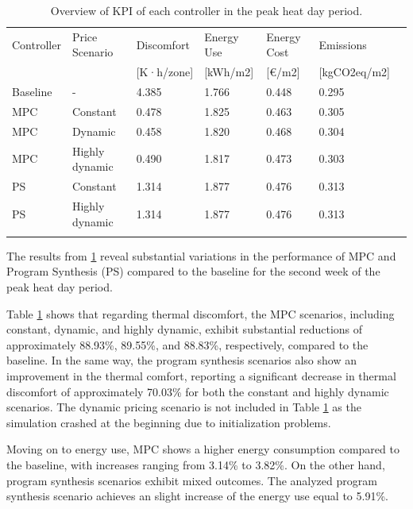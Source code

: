 \begin{table}
    \caption{Overview of KPI of each controller in the peak heat day period.}
    \label{tab:2}
    
    \centering
    \begin{tabular}{lllllll}
        \hline
        \noalign{\smallskip}
        Controller & Price Scenario & Discomfort & Energy Use & Energy Cost & Emissions  \\
        & & [K·h/zone] & [kWh/m2] & [€/m2] & [kgCO2eq/m2] \\
        \noalign{\smallskip}
        \hline
        \noalign{\smallskip}
        Baseline & - & 4.385 & 1.766 & 0.448 & 0.295 \\
        MPC & Constant & 0.478 & 1.825 & 0.463 & 0.305 \\
        MPC & Dynamic & 0.458 & 1.820 & 0.468 & 0.304 \\
        MPC & Highly dynamic & 0.490 & 1.817 & 0.473 & 0.303 \\
        PS & Constant & 1.314 & 1.877 & 0.476 & 0.313 \\
        PS & Highly dynamic & 1.314 & 1.877 & 0.476 & 0.313 \\
        \noalign{\smallskip}
        \hline
    \end{tabular}
\end{table}

 The results from \ref{tab:2} reveal substantial variations in the performance of MPC and Program Synthesis (PS) compared to the baseline for the second week of the peak heat day period.

Table \ref{tab:2} shows that regarding thermal discomfort, the MPC scenarios, including constant, dynamic, and highly dynamic, exhibit substantial reductions of approximately 88.93\%, 89.55\%, and 88.83\%, respectively, compared to the baseline. In the same way, the program synthesis scenarios also show an improvement in the thermal comfort, reporting a significant decrease in thermal discomfort of approximately 70.03\% for both the constant and highly dynamic scenarios. The dynamic pricing scenario is not included in Table \ref{tab:2} as the simulation crashed at the beginning due to initialization problems.

Moving on to energy use, MPC shows a higher energy consumption compared to the baseline, with increases ranging from 3.14\% to 3.82\%. On the other hand, program synthesis scenarios exhibit mixed outcomes. The analyzed program synthesis scenario achieves an slight increase of the energy use equal to 5.91\%.

